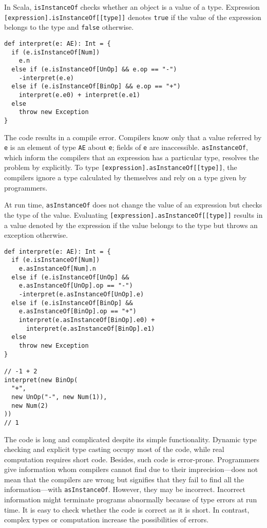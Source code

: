 In Scala, \verb!isInstanceOf! checks whether an object is a value of a type.
Expression \verb![expression].isInstanceOf[[type]]! denotes \verb!true! if the
value of the expression belongs to the type and \verb!false! otherwise.

\begin{verbatim}
def interpret(e: AE): Int = {
  if (e.isInstanceOf[Num])
    e.n
  else if (e.isInstanceOf[UnOp] && e.op == "-")
    -interpret(e.e)
  else if (e.isInstanceOf[BinOp] && e.op == "+")
    interpret(e.e0) + interpret(e.e1)
  else
    throw new Exception
}
\end{verbatim}

The code results in a compile error. Compilers know only that a value referred by
\verb!e! is an element of type \verb!AE! about \verb!e!; fields of \verb!e! are
inaccessible. \verb!asInstanceOf!, which inform the compilers that an expression
has a particular type, resolves the problem by  
explicitly. To type \verb![expression].asInstanceOf[[type]]!, the compilers
ignore a type calculated by themselves and rely on a type given by programmers.

At run time, \verb!asInstanceOf! does not change the value of an expression but
checks the type of the value. Evaluating \verb![expression].asInstanceOf[[type]]!
results in a value denoted by the expression if the value belongs to the type but
throws an exception otherwise.

\begin{verbatim}
def interpret(e: AE): Int = {
  if (e.isInstanceOf[Num])
    e.asInstanceOf[Num].n
  else if (e.isInstanceOf[UnOp] &&
    e.asInstanceOf[UnOp].op == "-")
    -interpret(e.asInstanceOf[UnOp].e)
  else if (e.isInstanceOf[BinOp] &&
    e.asInstanceOf[BinOp].op == "+")
    interpret(e.asInstanceOf[BinOp].e0) +
      interpret(e.asInstanceOf[BinOp].e1)
  else
    throw new Exception
}

// -1 + 2
interpret(new BinOp(
  "+",
  new UnOp("-", new Num(1)),
  new Num(2)
))
// 1
\end{verbatim}

The code is long and complicated despite its simple functionality. Dynamic type
checking and explicit type casting occupy most of the code, while real
computation requires short code. Besides, such code is error-prone. Programmers
give information whom compilers cannot find due to their imprecision---does not
mean that the compilers are wrong but signifies that they fail to find all the
information---with \verb!asInstanceOf!. However, they may be incorrect. Incorrect
information might terminate programs abnormally because of type errors at run
time. It is easy to check whether the code is correct as it is short. In
contrast, complex types or computation increase the possibilities of errors.

